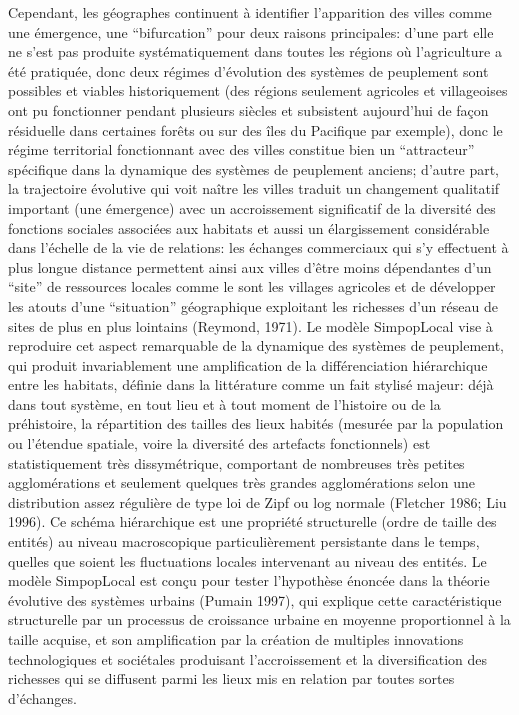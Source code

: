 \documentclass[10pt]{article}
\begin{document}
Cependant, les géographes continuent à identifier l’apparition des villes comme une émergence, une “bifurcation” pour deux raisons principales: d’une part elle ne s’est pas produite systématiquement dans toutes les régions où l’agriculture a été pratiquée, donc deux régimes d’évolution des systèmes de peuplement sont possibles et viables historiquement (des régions seulement agricoles et villageoises ont pu fonctionner pendant plusieurs siècles et subsistent aujourd’hui de façon résiduelle dans certaines forêts ou sur des îles du Pacifique par exemple), donc le régime territorial fonctionnant avec des villes constitue bien un “attracteur” spécifique dans la dynamique des systèmes de peuplement anciens; d’autre part, la trajectoire évolutive qui voit naître les villes traduit un changement qualitatif important (une émergence) avec un accroissement significatif de la diversité des fonctions sociales associées aux habitats et aussi un élargissement considérable dans l’échelle de la vie de relations: les échanges commerciaux qui s’y effectuent à plus longue distance permettent ainsi aux villes d’être moins dépendantes d’un “site” de ressources locales comme le sont les villages agricoles et de développer les atouts d’une “situation” géographique exploitant les richesses d’un réseau de sites de plus en plus lointains (Reymond, 1971). 
Le modèle SimpopLocal vise à reproduire cet aspect remarquable de la dynamique des systèmes de peuplement, qui produit invariablement une amplification de la différenciation hiérarchique entre les habitats, définie dans la littérature comme un fait stylisé majeur: déjà dans tout système, en tout lieu et à tout moment de l’histoire ou de la préhistoire, la répartition des tailles des lieux habités (mesurée par la population ou l’étendue spatiale, voire la diversité des artefacts fonctionnels) est statistiquement très dissymétrique, comportant de nombreuses très petites agglomérations et seulement quelques très grandes agglomérations selon une distribution assez régulière de type loi de Zipf ou log normale (Fletcher 1986; Liu 1996). Ce schéma hiérarchique est une propriété structurelle (ordre de taille des entités) au niveau macroscopique particulièrement persistante dans le temps, quelles que soient les fluctuations locales intervenant au niveau des entités. Le modèle SimpopLocal est conçu pour tester l'hypothèse énoncée dans la théorie évolutive des systèmes urbains (Pumain 1997), qui explique cette caractéristique structurelle par un processus de croissance urbaine en moyenne proportionnel à la taille acquise, et son amplification par la création de multiples innovations technologiques et sociétales produisant l’accroissement et la diversification des richesses qui se diffusent parmi les lieux mis en relation par toutes sortes d’échanges.
\end{document}
